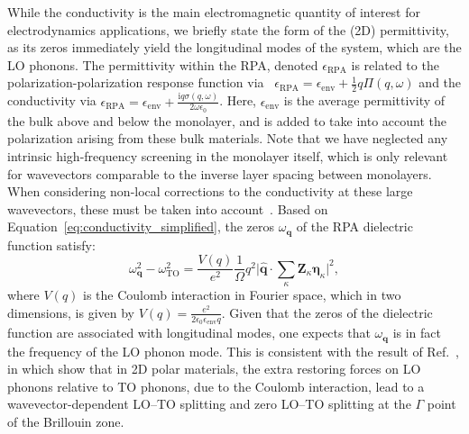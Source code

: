 \documentclass[aps,prb,twocolumn,
	           groupedaddress,superscriptaddress,
               amsfonts,amssymb,amsmath,floatfix,
	           citeautoscript]{revtex4-1}
\newcommand{\iu}{\mathrm{i}}
\begin{document}
While the conductivity is the main electromagnetic quantity of interest for electrodynamics applications, we briefly state the form of the (2D) permittivity, as its zeros immediately yield the longitudinal modes of the system, which are the LO phonons. The permittivity within the RPA, denoted $\epsilon_{\textrm{RPA}}$ is related to the polarization-polarization response function via~\cite{jablan2009plasmonics} $\epsilon_{\textrm{RPA}} = \epsilon_{\mathrm{env}} + \frac{1}{2}q\Pi(q,\omega)$ and the conductivity via $\epsilon_{\textrm{RPA}} = \epsilon_{\mathrm{env}} + \frac{\iu q\sigma(q,\omega)}{2\omega\epsilon_0}$. Here, $\epsilon_{\mathrm{env}}$ is the average permittivity of the bulk above and below the monolayer, and is added to take into account the polarization arising from these bulk materials. Note that we have neglected any intrinsic high-frequency screening in the monolayer itself, which is only relevant for wavevectors comparable to the inverse layer spacing between monolayers. When considering non-local corrections to the conductivity at these large wavevectors, these must be taken into account~\cite{sohier2016two,thygesen2017calculating,sohier2017breakdown}. Based on Equation~\eqref{eq:conductivity_simplified}, the zeros $\omega_{\mathbf{q}}$ of the RPA dielectric function satisfy:
\begin{equation}
    \omega^2_{\mathbf{q}} - \omega^2_{\mathrm{TO}} = \frac{V(q)}{e^2}\frac{1}{\Omega}q^2\Big|\hat{\mathbf{q}}\cdot\sum\limits_{\kappa}\mathbf{Z}_{\kappa}\boldsymbol{\eta}_{\kappa}\Big|^2,
    \label{eq:zerosofresponse}
\end{equation}
  where $V(q)$ is the Coulomb interaction in Fourier space, which in two dimensions, is given by $V(q) = \frac{e^2}{2\epsilon_0\epsilon_{\mathrm{env}}q}$. Given that the zeros of the dielectric function are associated with longitudinal modes, one expects that $\omega_{\mathbf{q}}$ is in fact the frequency of the LO phonon mode. This is consistent with the result of Ref.~, in which \relax{{}\ }\citeauthor{sohier2017breakdown} show that in 2D polar materials, the extra restoring forces on LO phonons relative to TO phonons, due to the Coulomb interaction, lead to a wavevector-dependent LO--TO splitting and zero LO--TO splitting at the $\Gamma$ point of the Brillouin zone. 
  
\end{document}
